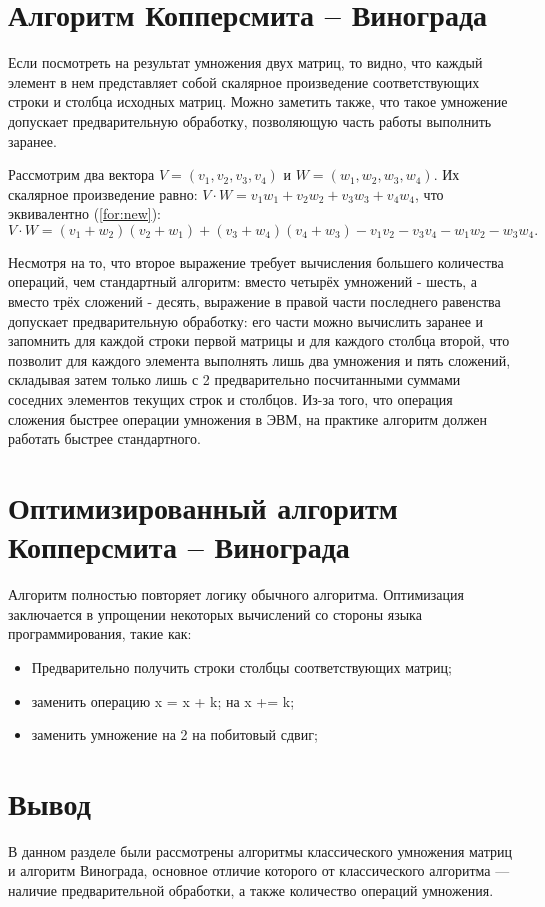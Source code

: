 \section{Алгоритм Копперсмита -- Винограда}

Если посмотреть на результат умножения двух матриц, то видно, что каждый элемент в нем представляет собой скалярное произведение соответствующих строки и столбца исходных матриц.
Можно заметить также, что такое умножение допускает предварительную обработку, позволяющую часть работы выполнить заранее.

Рассмотрим два вектора $V = (v_1, v_2, v_3, v_4)$ и $W = (w_1, w_2, w_3, w_4)$.
Их скалярное произведение равно: $V \cdot W = v_1w_1 + v_2w_2 + v_3w_3 + v_4w_4$, что эквивалентно (\ref{for:new}):
\begin{equation}
    \label{for:new}
    V \cdot W = (v_1 + w_2)(v_2 + w_1) + (v_3 + w_4)(v_4 + w_3) - v_1v_2 - v_3v_4 - w_1w_2 - w_3w_4.
\end{equation}

Несмотря на то, что второе выражение требует вычисления большего количества операций, чем стандартный алгоритм: вместо четырёх умножений - шесть, а вместо трёх сложений - десять, выражение в правой части последнего равенства допускает предварительную обработку: его части можно вычислить заранее и запомнить для каждой строки первой матрицы и для каждого столбца второй, что позволит для каждого элемента выполнять лишь два умножения и пять сложений, складывая затем только лишь с 2 предварительно посчитанными суммами соседних элементов текущих строк и столбцов.
Из-за того, что операция сложения быстрее операции умножения в ЭВМ, на практике алгоритм должен работать быстрее стандартного.

\section{Оптимизированный алгоритм Копперсмита -- Винограда}

Алгоритм полностью повторяет логику обычного алгоритма. Оптимизация заключается в упрощении некоторых вычислений со стороны языка программирования, такие как:

\begin{itemize}
    \item Предварительно получить строки столбцы соответствующих матриц;
    \item заменить операцию x = x + k; на x += k;
    \item заменить умножение на 2 на побитовый сдвиг;
\end{itemize}

\section*{Вывод}
В данном разделе были рассмотрены алгоритмы классического умножения матриц и алгоритм Винограда, основное отличие которого от классического алгоритма — наличие предварительной обработки, а также количество операций умножения.
\clearpage
